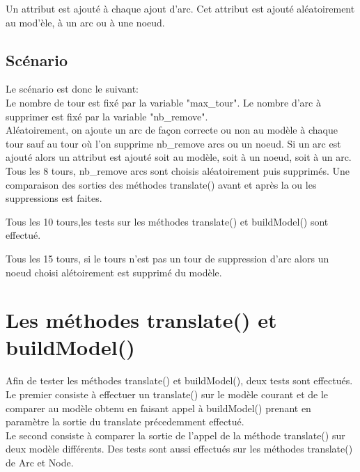 \documentclass{article}
\begin{document}
Un attribut est ajout\'e \`a chaque ajout d'arc.
Cet attribut est ajout\'e al\'eatoirement au mod'\`ele, \`a un arc ou \`a une noeud. 


\subsection{Sc\'enario}

Le sc\'enario est donc le suivant:\\

Le nombre de tour est fix\'e par la variable "max\_tour".
Le nombre d'arc \`a supprimer est fix\'e par la variable "nb\_remove".\\

Al\'eatoirement, on ajoute un arc de façon correcte ou non au mod\`ele \`a chaque tour sauf au tour 
o\`u l'on supprime nb\_remove arcs ou un noeud.
Si un arc est ajout\'e alors un attribut est ajout\'e soit au mod\`ele, soit \`a un noeud, soit \`a un arc.\\

Tous les 8 tours, nb\_remove arcs sont choisis al\'eatoirement puis supprim\'es.
Une comparaison des sorties des m\'ethodes translate() avant et apr\`es la ou les suppressions 
est faites.

Tous les 10 tours,les tests sur les m\'ethodes translate() et buildModel() sont effectu\'e.

Tous les 15 tours, si le tours n'est pas un tour de suppression d'arc alors un noeud choisi al\'etoirement est supprim\'e du mod\`ele.



\section{Les m\'ethodes translate() et buildModel()}

Afin de tester les m\'ethodes translate() et buildModel(), deux tests sont effectu\'es.\\

Le premier consiste \`a effectuer un translate() sur le mod\`ele courant et de le comparer 
au mod\`ele obtenu en faisant appel \`a buildModel() prenant en param\`etre
la sortie du translate pr\'ecedemment effectu\'e.\\

Le second consiste \`a comparer la sortie de l'appel de la m\'ethode translate() sur deux mod\`ele diff\'erents.
Des tests sont aussi effectu\'es sur les m\'ethodes translate() de Arc et Node.
\end{document}
